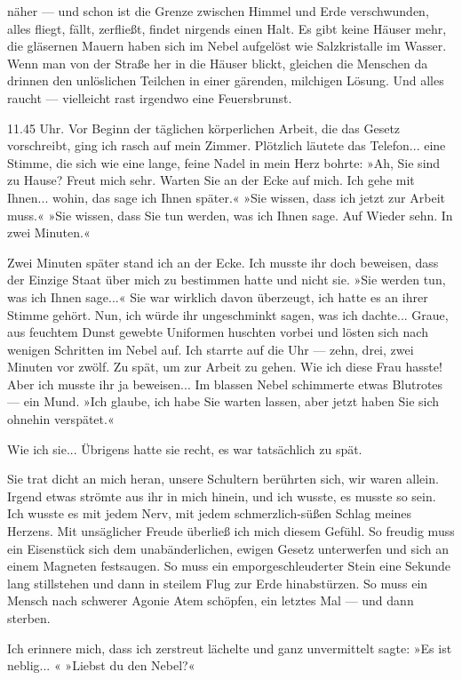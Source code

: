 näher — und schon ist die Grenze zwischen Himmel und Erde
verschwunden, alles fliegt, fällt, zerfließt, findet nirgends einen
Halt. Es gibt keine Häuser mehr, die gläsernen Mauern haben sich im
Nebel aufgelöst wie Salzkristalle im Wasser. Wenn man von der
Straße her in die Häuser blickt, gleichen die Menschen da drinnen
den unlöslichen Teilchen in einer gärenden, milchigen Lösung. Und
alles raucht — vielleicht rast irgendwo eine Feuersbrunst.

11.45 Uhr. Vor Beginn der täglichen körperlichen Arbeit, die das
Gesetz vorschreibt, ging ich rasch auf mein Zimmer. Plötzlich
läutete das Telefon... eine Stimme, die sich wie eine lange, feine
Nadel in mein Herz bohrte: »Ah, Sie sind zu Hause? Freut mich sehr.
Warten Sie an der Ecke auf mich. Ich gehe mit Ihnen... wohin, das
sage ich Ihnen später.« »Sie wissen, dass ich jetzt zur Arbeit
muss.« »Sie wissen, dass Sie tun werden, was ich Ihnen sage. Auf
Wieder sehn. In zwei Minuten.«

Zwei Minuten später stand ich an der Ecke. Ich musste ihr doch
beweisen, dass der Einzige Staat über mich zu bestimmen hatte und
nicht sie. »Sie werden tun, was ich Ihnen sage...« Sie war wirklich
davon überzeugt, ich hatte es an ihrer Stimme gehört. Nun, ich
würde ihr ungeschminkt sagen, was ich dachte... Graue, aus feuchtem
Dunst gewebte Uniformen huschten vorbei und lösten sich nach
wenigen Schritten im Nebel auf. Ich starrte auf die Uhr — zehn,
drei, zwei Minuten vor zwölf. Zu spät, um zur Arbeit zu gehen. Wie
ich diese Frau hasste! Aber ich musste ihr ja beweisen... Im
blassen Nebel schimmerte etwas Blutrotes — ein Mund. »Ich glaube,
ich habe Sie warten lassen, aber jetzt haben Sie sich ohnehin
verspätet.«

Wie ich sie... Übrigens hatte sie recht, es war tatsächlich zu
spät.

Sie trat dicht an mich heran, unsere Schultern berührten sich, wir
waren allein. Irgend etwas strömte aus ihr in mich hinein, und ich
wusste, es musste so sein. Ich wusste es mit jedem Nerv, mit jedem
schmerzlich-süßen Schlag meines Herzens. Mit unsäglicher Freude
überließ ich mich diesem Gefühl. So freudig muss ein Eisenstück
sich dem unabänderlichen, ewigen Gesetz unterwerfen und sich an
einem Magneten festsaugen. So muss ein emporgeschleuderter Stein
eine Sekunde lang stillstehen und dann in steilem Flug zur Erde
hinabstürzen. So muss ein Mensch nach schwerer Agonie Atem
schöpfen, ein letztes Mal — und dann sterben.

Ich erinnere mich, dass ich zerstreut lächelte und ganz
unvermittelt sagte: »Es ist neblig... « »Liebst du den Nebel?«

